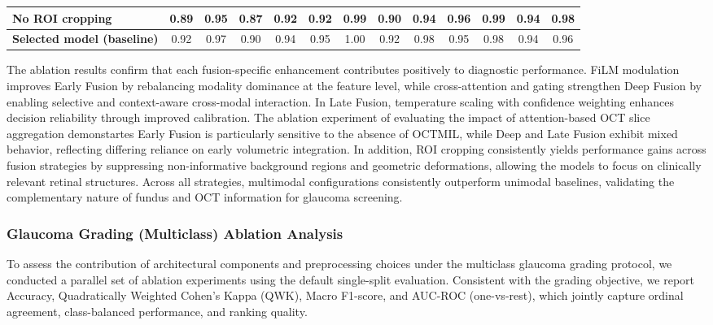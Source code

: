 \documentclass[preprint,12pt]{elsarticle}
\begin{document}
\begin{table}[!t]
\begin{tabular}{|l|cccc|cccc|cccc|}
        \hline
        \textbf{No ROI cropping}           &
        0.89                               & 0.95 & 0.87 & 0.92 &
        0.92                               & 0.99 & 0.90 & 0.94 &
        0.96                               & 0.99 & 0.94 & 0.98         \\
        \hline
        \textbf{Selected model (baseline)} &
        0.92                               & 0.97 & 0.90 & 0.94 &
        0.95                               & 1.00 & 0.92 & 0.98 &
        0.95                               & 0.98 & 0.94 & 0.96         \\
        \hline
    \end{tabular}
\end{table}

The ablation results confirm that each fusion-specific enhancement contributes positively to diagnostic performance. FiLM modulation improves Early Fusion by rebalancing modality dominance at the feature level, while cross-attention and gating strengthen Deep Fusion by enabling selective and context-aware cross-modal interaction. In Late Fusion, temperature scaling with confidence weighting enhances decision reliability through improved calibration. The ablation experiment of evaluating the impact of attention-based OCT slice aggregation demonstartes Early Fusion is particularly sensitive to the absence of OCTMIL, while Deep and Late Fusion exhibit mixed behavior, reflecting differing reliance on early volumetric integration. In addition, ROI cropping consistently yields performance gains across fusion strategies by suppressing non-informative background regions and geometric deformations, allowing the models to focus on clinically relevant retinal structures. Across all strategies, multimodal configurations consistently outperform unimodal baselines, validating the complementary nature of fundus and OCT information for glaucoma screening.


\subsubsection{Glaucoma Grading (Multiclass) Ablation Analysis}

To assess the contribution of architectural components and preprocessing choices under the multiclass glaucoma grading protocol, we conducted a parallel set of ablation experiments using the default single-split evaluation. Consistent with the grading objective, we report Accuracy, Quadratically Weighted Cohen’s Kappa (QWK), Macro F1-score, and AUC-ROC (one-vs-rest), which jointly capture ordinal agreement, class-balanced performance, and ranking quality.
\end{document}
